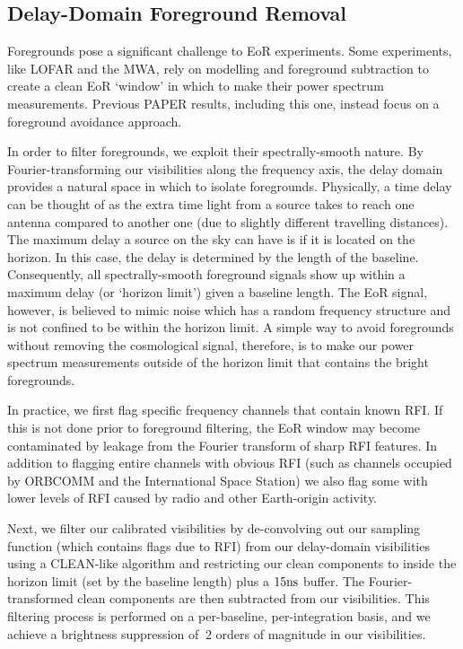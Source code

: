 \documentclass[preprint2,numberedappendix,tighten,twocolappendix]{aastex6}  %
\begin{document}
\subsection{Delay-Domain Foreground Removal}
\label{sec:fgclean}

Foregrounds pose a significant challenge to EoR experiments. Some experiments, like LOFAR and the MWA, rely on modelling and foreground subtraction to create a clean EoR `window' in which to make their power spectrum measurements. Previous PAPER results, including this one, instead focus on a foreground avoidance approach. 

In order to filter foregrounds, we exploit their spectrally-smooth nature. By Fourier-transforming our visibilities along the frequency axis, the delay domain provides a natural space in which to isolate foregrounds. Physically, a time delay can be thought of as the extra time light from a source takes to reach one antenna compared to another one (due to slightly different travelling distances). The maximum delay a source on the sky can have is if it is located on the horizon. In this case, the delay is determined by the length of the baseline. Consequently, all spectrally-smooth foreground signals show up within a maximum delay (or `horizon limit') given a baseline length. The EoR signal, however, is believed to mimic noise which has a random frequency structure and is not confined to be within the horizon limit. A simple way to avoid foregrounds without removing the cosmological signal, therefore, is to make our power spectrum measurements outside of the horizon limit that contains the bright foregrounds. 

In practice, we first flag specific frequency channels that contain known RFI. If this is not done prior to foreground filtering, the EoR window may become contaminated by leakage from the Fourier transform of sharp RFI features. In addition to flagging entire channels with obvious RFI (such as channels occupied by ORBCOMM and the International Space Station) we also flag some with lower levels of RFI caused by radio and other Earth-origin activity.

Next, we filter our calibrated visibilities by de-convolving out our sampling function (which contains flags due to RFI) from our delay-domain visibilities using a CLEAN-like algorithm and restricting our clean components to inside the horizon limit (set by the baseline length) plus a $15 {\rm ns}$ buffer. The Fourier-transformed clean components are then subtracted from our visibilities. This filtering process is performed on a per-baseline, per-integration basis, and we achieve a brightness suppression of $~2$ orders of magnitude in our visibilities. 
\end{document}
